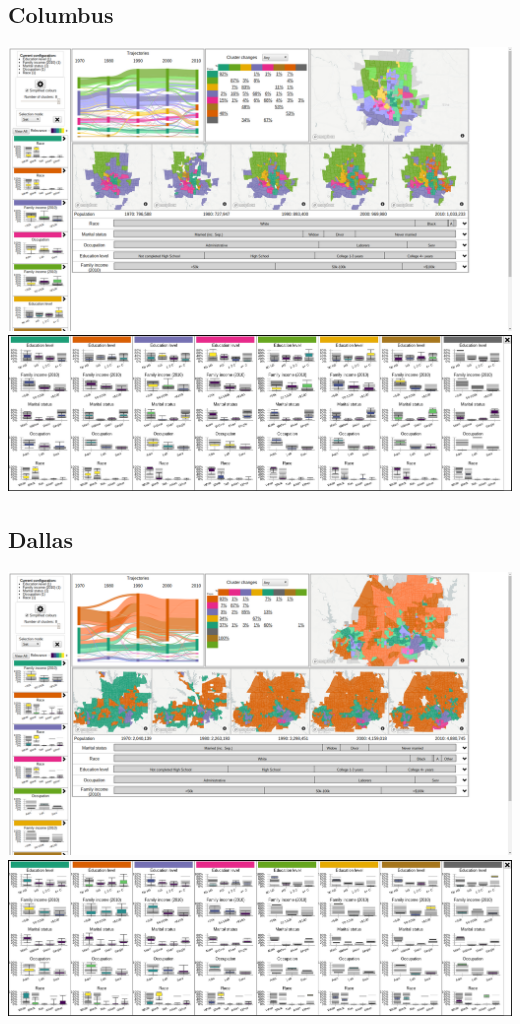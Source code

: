 \documentclass[a4paper]{article}
\begin{document}
\subsection{Columbus}
\begin{center}
	\includegraphics[width=\linewidth]{21a.png}
	\includegraphics[width=\linewidth]{21b.png}
\end{center} \clearpage



\subsection{Dallas}
\begin{center}
	\includegraphics[width=\linewidth]{22a.png}
	\includegraphics[width=\linewidth]{22b.png}
\end{center} \clearpage
\end{document}
